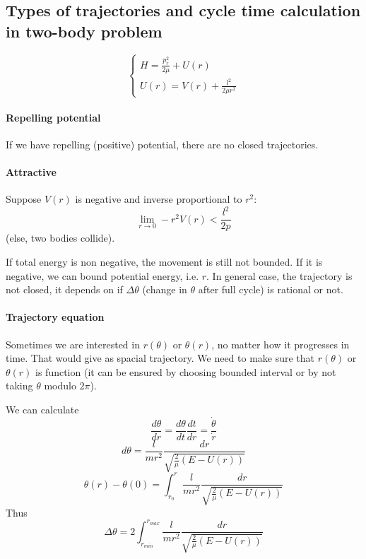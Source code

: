 \subsection{Types of trajectories and cycle time calculation in two-body problem}
$$\begin{cases}
H = \frac{p_r^2}{2\mu} + U(r)\\
U(r) = V(r) + \frac{l^2}{2\mu r^2}
\end{cases}$$

\paragraph{Repelling potential}
If we have repelling (positive) potential, there are no closed trajectories.
\paragraph{Attractive}
Suppose $V(r)$ is negative and inverse proportional to $r^2$:
$$\lim_{r\to 0} -r^2 V(r) < \frac{l^2}{2p}$$
(else, two bodies collide).

If total energy is non negative, the movement is still not bounded. If it is negative, we can bound potential energy, i.e. $r$. In general case, the trajectory is not closed, it depends on if $\Delta \theta$ (change in $\theta$ after full cycle) is rational or not.

\paragraph{Trajectory equation}
Sometimes we are interested in $r(\theta)$ or $\theta(r)$, no matter how it progresses in time. That would give as spacial trajectory. We need to make sure that $r(\theta)$ or $\theta(r)$ is function (it can be ensured by choosing bounded interval or by not taking $\theta$ modulo $2\pi$).

We can calculate
$$\frac{d\theta}{dr} = \frac{d\theta}{dt} \frac{dt}{dr} = \frac{\dot{\theta}}{\dot{r}}$$
$$d\theta = \frac{l}{mr^2} \frac{dr}{ \sqrt{\frac{2}{\mu}(E-U(r))}}$$
$$\theta(r) - \theta(0) = \int_{r_0}^r \frac{l}{mr^2} \frac{dr}{ \sqrt{\frac{2}{\mu}(E-U(r))}}$$
Thus
$$\Delta \theta = 2\int_{r_{min}}^{r_{max}} \frac{l}{mr^2} \frac{dr}{ \sqrt{\frac{2}{\mu}(E-U(r))}}$$
